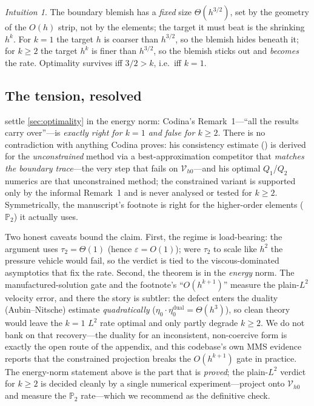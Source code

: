 \documentclass[11pt]{article}
\newcommand{\Vhz}{\mathcal{V}_{h0}}
\theoremstyle{plain}
\theoremstyle{definition}
\theoremstyle{remark}
\newtheorem*{intuition}{Intuition}
\begin{document}
\begin{intuition}
The boundary blemish has a \emph{fixed} size $\Theta(h^{3/2})$, set by the
geometry of the $O(h)$ strip, not by the elements; the target it must beat is
the shrinking $h^{k}$. For $k=1$ the target $h$ is coarser than $h^{3/2}$, so
the blemish hides beneath it; for $k\ge2$ the target $h^{k}$ is finer than
$h^{3/2}$, so the blemish sticks out and \emph{becomes} the rate. Optimality
survives iff $3/2>k$, i.e.\ iff $k=1$.
\end{intuition}

\subsection{The tension, resolved}

 settle \cref{sec:optimality} in the
energy norm: Codina's Remark~1---``all the results carry over''---is
\emph{exactly right for $k=1$ and false for $k\ge2$}. There is no
contradiction with anything Codina proves: his consistency estimate
(\cite[Lemma~3]{codina2008}) is derived for the \emph{unconstrained} method
via a best-approximation competitor that \emph{matches the boundary
trace}---the very step that fails on $\Vhz$---and his optimal $Q_1$/$Q_2$
numerics are that unconstrained method; the constrained variant is supported
only by the informal Remark~1 and is never analysed or tested for $k\ge2$.
Symmetrically, the manuscript's footnote is right for the higher-order
elements ($\mathbb P_2$) it actually uses.

Two honest caveats bound the claim. First, the regime is load-bearing:
the argument uses $\tau_2=\Theta(1)$ (hence $\varepsilon=O(1)$); were
$\tau_2$ to scale like $h^2$ the pressure vehicle would fail, so the verdict
is tied to the viscous-dominated asymptotics that fix the rate. Second,
the theorem is in the \emph{energy} norm. The manufactured-solution gate
and the footnote's ``$O(h^{k+1})$'' measure the plain-$L^2$ velocity
error, and there the story is subtler: the defect enters the duality
(Aubin--Nitsche) estimate \emph{quadratically}
($\eta_0\cdot\eta_0^{\mathrm{dual}}=\Theta(h^3)$), so clean theory would leave
the $k=1$ $L^2$ rate optimal and only partly degrade $k\ge2$. We do not bank
on that recovery---the duality for an inconsistent, non-coercive form is
exactly the open route of the appendix, and this codebase's own MMS evidence
reports that the constrained projection breaks the $O(h^{k+1})$ gate in
practice. The energy-norm statement above is the part that is
\emph{proved}; the plain-$L^2$ verdict for $k\ge2$ is decided cleanly by
a single numerical experiment---project onto $\Vhz$ and measure the
$\mathbb P_2$ rate---which we recommend as the definitive check.
\end{document}
